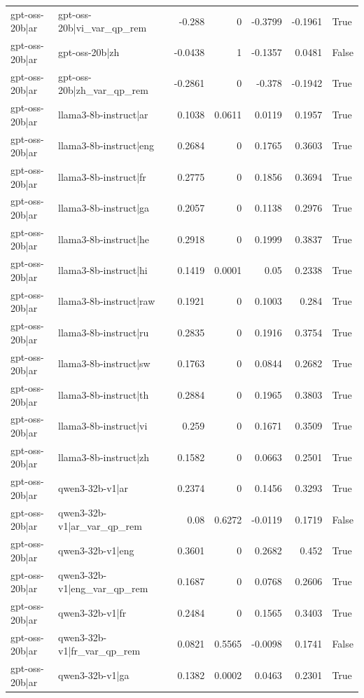 \begin{table}
\begin{tabular}{l l r r r r l}
gpt-oss-20b|ar & gpt-oss-20b|vi_var_qp_rem & -0.288 & 0 & -0.3799 & -0.1961 & True \\
gpt-oss-20b|ar & gpt-oss-20b|zh & -0.0438 & 1 & -0.1357 & 0.0481 & False \\
gpt-oss-20b|ar & gpt-oss-20b|zh_var_qp_rem & -0.2861 & 0 & -0.378 & -0.1942 & True \\
gpt-oss-20b|ar & llama3-8b-instruct|ar & 0.1038 & 0.0611 & 0.0119 & 0.1957 & True \\
gpt-oss-20b|ar & llama3-8b-instruct|eng & 0.2684 & 0 & 0.1765 & 0.3603 & True \\
gpt-oss-20b|ar & llama3-8b-instruct|fr & 0.2775 & 0 & 0.1856 & 0.3694 & True \\
gpt-oss-20b|ar & llama3-8b-instruct|ga & 0.2057 & 0 & 0.1138 & 0.2976 & True \\
gpt-oss-20b|ar & llama3-8b-instruct|he & 0.2918 & 0 & 0.1999 & 0.3837 & True \\
gpt-oss-20b|ar & llama3-8b-instruct|hi & 0.1419 & 0.0001 & 0.05 & 0.2338 & True \\
gpt-oss-20b|ar & llama3-8b-instruct|raw & 0.1921 & 0 & 0.1003 & 0.284 & True \\
gpt-oss-20b|ar & llama3-8b-instruct|ru & 0.2835 & 0 & 0.1916 & 0.3754 & True \\
gpt-oss-20b|ar & llama3-8b-instruct|sw & 0.1763 & 0 & 0.0844 & 0.2682 & True \\
gpt-oss-20b|ar & llama3-8b-instruct|th & 0.2884 & 0 & 0.1965 & 0.3803 & True \\
gpt-oss-20b|ar & llama3-8b-instruct|vi & 0.259 & 0 & 0.1671 & 0.3509 & True \\
gpt-oss-20b|ar & llama3-8b-instruct|zh & 0.1582 & 0 & 0.0663 & 0.2501 & True \\
gpt-oss-20b|ar & qwen3-32b-v1|ar & 0.2374 & 0 & 0.1456 & 0.3293 & True \\
gpt-oss-20b|ar & qwen3-32b-v1|ar_var_qp_rem & 0.08 & 0.6272 & -0.0119 & 0.1719 & False \\
gpt-oss-20b|ar & qwen3-32b-v1|eng & 0.3601 & 0 & 0.2682 & 0.452 & True \\
gpt-oss-20b|ar & qwen3-32b-v1|eng_var_qp_rem & 0.1687 & 0 & 0.0768 & 0.2606 & True \\
gpt-oss-20b|ar & qwen3-32b-v1|fr & 0.2484 & 0 & 0.1565 & 0.3403 & True \\
gpt-oss-20b|ar & qwen3-32b-v1|fr_var_qp_rem & 0.0821 & 0.5565 & -0.0098 & 0.1741 & False \\
gpt-oss-20b|ar & qwen3-32b-v1|ga & 0.1382 & 0.0002 & 0.0463 & 0.2301 & True \\

\end{tabular}
\end{table}
